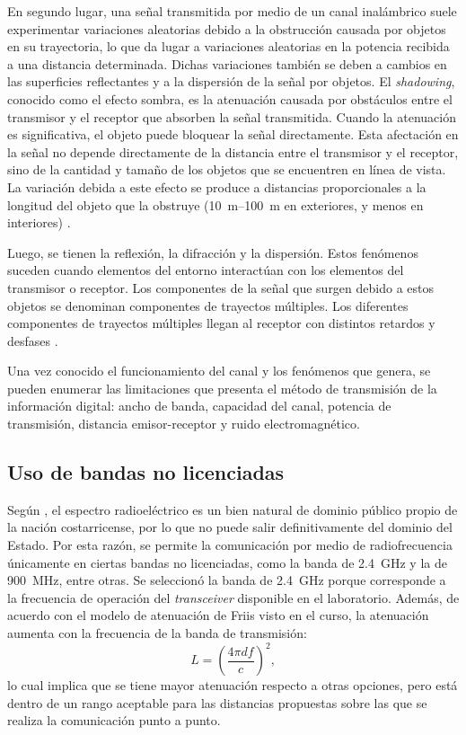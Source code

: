 En segundo lugar, una señal transmitida por medio de un canal inalámbrico suele experimentar variaciones aleatorias debido a la obstrucción causada por objetos en su trayectoria, lo que da lugar a variaciones aleatorias en la potencia recibida a una distancia determinada.
Dichas variaciones también se deben a cambios en las superficies reflectantes y a la dispersión de la señal por objetos.
El \textit{shadowing}, conocido como el efecto sombra, es la atenuación causada por obstáculos entre el transmisor y el receptor que absorben la señal transmitida.
Cuando la atenuación es significativa, el objeto puede bloquear la señal directamente.
Esta afectación en la señal no depende directamente de la distancia entre el transmisor y el receptor, sino de la cantidad y tamaño de los objetos que se encuentren en línea de vista.
La variación debida a este efecto se produce a distancias proporcionales a la longitud del objeto que la obstruye (\SIrange{10}{100}{\meter} en exteriores, y menos en interiores) \cite{wireless}.

Luego, se tienen la reflexión, la difracción y la dispersión.
Estos fenómenos suceden cuando elementos del entorno interactúan con los elementos del transmisor o receptor.
Los componentes de la señal que surgen debido a estos objetos se denominan componentes de trayectos múltiples.
Los diferentes componentes de trayectos múltiples llegan al receptor con distintos retardos y desfases \cite{wireless}.

Una vez conocido el funcionamiento del canal y los fenómenos que genera, se pueden enumerar las limitaciones que presenta el método de transmisión de la información digital: ancho de banda, capacidad del canal, potencia de transmisión, distancia emisor-receptor y ruido electromagnético.

\subsection{Uso de bandas no licenciadas}

Según \cite{SUTEL}, el espectro radioeléctrico es un bien natural de dominio público propio de la nación costarricense, por lo que no puede salir definitivamente del dominio del Estado.
Por esta razón, se permite la comunicación por medio de radiofrecuencia únicamente en ciertas bandas no licenciadas, como la banda de \SI{2.4}{\giga\hertz} y la de \SI{900}{\mega\hertz}, entre otras.
Se seleccionó la banda de \SI{2.4}{\giga\hertz} porque corresponde a la frecuencia de operación del \textit{transceiver} disponible en el laboratorio.
Además, de acuerdo con el modelo de atenuación de Friis visto en el curso, la atenuación aumenta con la frecuencia de la banda de transmisión:
\begin{equation}
    L = \left(\frac{4 \pi d f}{c}\right)^2,
\end{equation}
lo cual implica que se tiene mayor atenuación respecto a otras opciones, pero está dentro de un rango aceptable para las distancias propuestas sobre las que se realiza la comunicación punto a punto.

